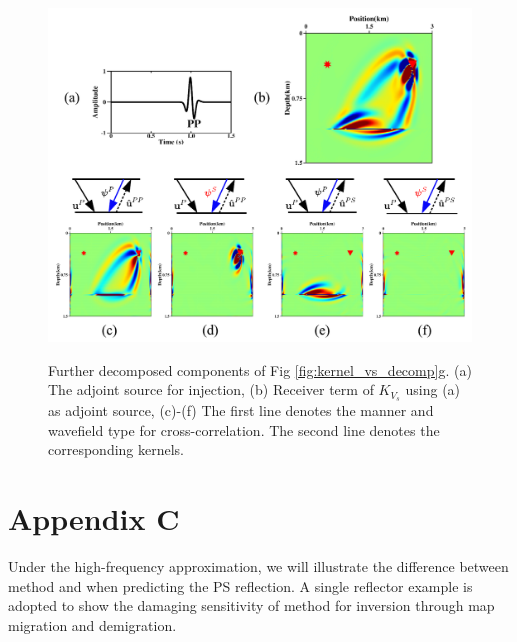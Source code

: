 \begin{figure}[!htb]
   \centering
   {\includegraphics[width=1.0\textwidth]{Kernel/Combinations/K_vs_recPP_new.pdf}}
   \caption{Further decomposed components of Fig \ref{fig:kernel_vs_decomp}g. (a) The adjoint source
   for injection, (b) Receiver term of $K_{V_s}$ using (a) as adjoint source, (c)-(f) 
   The first line denotes the manner and wavefield type for cross-correlation.
   The second line denotes the corresponding kernels.
   }
   \label{fig:kernel_vs_recPP}
\end{figure}
\section{Appendix C}
Under the high-frequency approximation, we will illustrate the difference between method
{\bf\uppercase\expandafter{}} and {\bf\uppercase\expandafter{}} when
predicting the PS reflection.
A single reflector example is adopted to show the damaging sensitivity of method
{\bf\uppercase\expandafter{}} for inversion through 
map migration and demigration.


